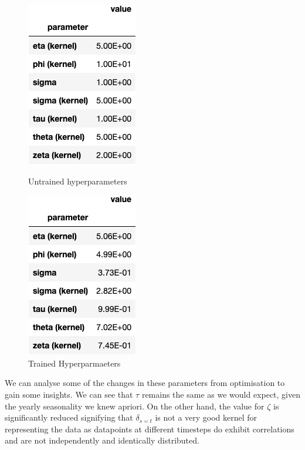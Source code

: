 \documentclass[12pt]{article}
\begin{document}
\begin{figure}[h]
\centering
\begin{minipage}{.5\textwidth}
  \centering
\includegraphics[scale=0.5]{outputs/q2/f-untrained-parameters}
\caption{Untrained hyperparameters}
\label{fig:f-untrained-parameters}
\end{minipage}%
\begin{minipage}{.5\textwidth}
  \centering
\includegraphics[scale=0.5]{outputs/q2/f-trained-parameters}
\caption{Trained Hyperparmaeters}
\label{fig:f-trained-parameters}
\end{minipage}
\end{figure}

We can analyse some of the changes in these parameters from optimisation to gain some insights.
We can see that $\tau$ remains the same as we would expect, given the yearly seasonality we knew apriori.
On the other hand, the value for $\zeta$ is significantly reduced signifying that $\delta_{s=t}$ is not a very good kernel for representing the data as datapoints at different timesteps do exhibit correlations and are not independently and identically distributed.
\end{document}

